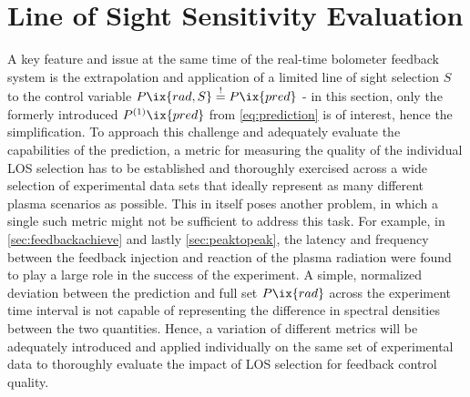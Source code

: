     \section{Line of Sight Sensitivity Evaluation}\label{sec:evalmetrics}%
%
        A key feature and issue at the same time of the real-time bolometer feedback system is the extrapolation and application of a limited line of sight selection $S$ to the control variable $P\ix{rad,S}\overset{!}{=}P\ix{pred}$ - in this section, only the formerly introduced $P^{\text{(1)}}\ix{pred}$ from \cref{eq:prediction} is of interest, hence the simplification. To approach this challenge and adequately evaluate the capabilities of the prediction, a metric for measuring the quality of the individual LOS selection has to be established and thoroughly exercised across a wide selection of experimental data sets that ideally represent as many different plasma scenarios as possible. This in itself poses another problem, in which a single such metric might not be sufficient to address this task. For example, in \cref{sec:feedbackachieve} and lastly \cref{sec:peaktopeak}, the latency and frequency between the feedback injection and reaction of the plasma radiation were found to play a large role in the success of the experiment. A simple, normalized deviation between the prediction and full set $P\ix{rad}$ across the experiment time interval is not capable of representing the difference in spectral densities between the two quantities. Hence, a variation of different metrics will be adequately introduced and applied individually on the same set of experimental data to thoroughly evaluate the impact of LOS selection for feedback control quality.%
%
